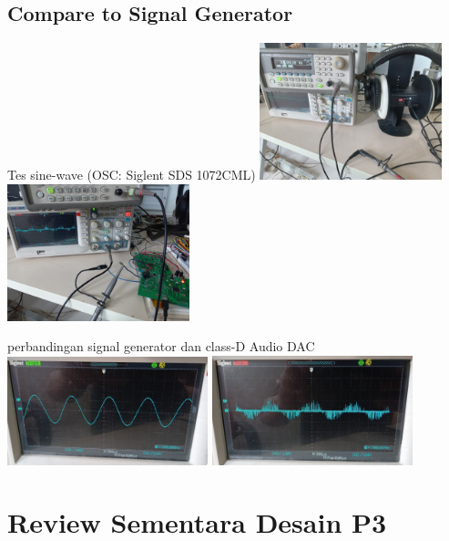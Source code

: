 \documentclass[table,dvipsnames]{beamer}
\begin{document}
	\begin{frame}
		\subsection{Compare to Signal Generator}
		\begin{exampleblock}{Tes sine-wave  (OSC: Siglent SDS 1072CML)}
			\includegraphics[width=150pt]{images/sine_sig_test}
			\includegraphics[width=150pt]{images/sine_sig_test_dac}
		\end{exampleblock}
	
		\begin{exampleblock}{perbandingan signal generator dan class-D Audio DAC}
			\includegraphics[width=165pt]{images/sine_sig_gen}
			\includegraphics[width=165pt]{images/sine_sig_dac}
		\end{exampleblock}
	\end{frame}
	
	\section {Review Sementara Desain P3}
	
\end{document}
